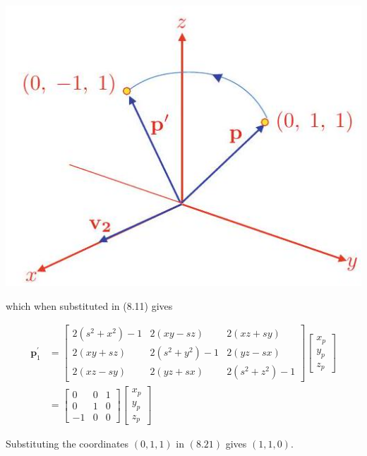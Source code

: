 \documentclass[10pt]{article}
\begin{document}
\begin{center}
\includegraphics[max width=\textwidth]{2023_04_20_41f1ceac5a31dc7d1b59g-169}
\end{center}

which when substituted in (8.11) gives

$$
\begin{aligned}
\mathbf{p}_{1}^{\prime} & =\left[\begin{array}{ccc}
2\left(s^{2}+x^{2}\right)-1 & 2(x y-s z) & 2(x z+s y) \\
2(x y+s z) & 2\left(s^{2}+y^{2}\right)-1 & 2(y z-s x) \\
2(x z-s y) & 2(y z+s x) & 2\left(s^{2}+z^{2}\right)-1
\end{array}\right]\left[\begin{array}{l}
x_{p} \\
y_{p} \\
z_{p}
\end{array}\right] \\
& =\left[\begin{array}{ccc}
0 & 0 & 1 \\
0 & 1 & 0 \\
-1 & 0 & 0
\end{array}\right]\left[\begin{array}{l}
x_{p} \\
y_{p} \\
z_{p}
\end{array}\right]
\end{aligned}
$$

Substituting the coordinates $(0,1,1)$ in $(8.21)$ gives $(1,1,0)$.
\end{document}
